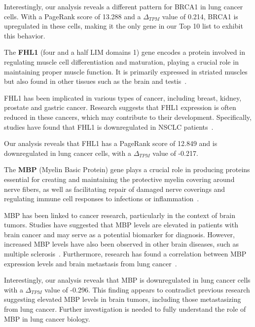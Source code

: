 Interestingly, our analysis reveals a different pattern for BRCA1 in lung cancer cells.
With a PageRank score of 13.288 and a $\Delta_{TPM}$ value of 0.214,
BRCA1 is upregulated in these cells, making it the only gene in our Top 10 list to exhibit this behavior.
\newline

The \textbf{FHL1} (four and a half LIM domains 1) gene encodes a protein
involved in regulating muscle cell differentiation and maturation,
playing a crucial role in maintaining proper muscle function.
It is primarily expressed in striated muscles but also found in other tissues such as the brain and testis~\cite{Storey2020FHL1}.

FHL1 has been implicated in various types of cancer, including breast, kidney, prostate and gastric cancer.
Research suggests that FHL1 expression is often reduced in these cancers,
which may contribute to their development\cite{Li2008FHL1, Sakashita2008FHL1}.
Specifically, studies have found that FHL1 is downregulated in NSCLC patients~\cite{Niu2012FHL1}.

Our analysis reveals that FHL1 has a PageRank score of 12.849 and is downregulated in lung cancer cells,
with a $\Delta_{TPM}$ value of -0.217.
\newline

The \textbf{MBP} (Myelin Basic Protein) gene plays a crucial role in producing proteins essential for creating and
maintaining the protective myelin covering around nerve fibers, as well as
facilitating repair of damaged nerve coverings and regulating immune cell responses to infections or inflammation~\cite{Nye1995MBP}.

MBP has been linked to cancer research, particularly in the context of brain tumors.
Studies have suggested that MBP levels are elevated in patients with brain cancer and may serve as a potential biomarker for diagnosis.
However, increased MBP levels have also been observed in other brain diseases, such as multiple sclerosis~\cite{Zavialova2017MBP}.
Furthermore, research has found a correlation between MBP expression levels and brain metastasis from lung cancer~\cite{Nakagawa1994MBP}.

Interestingly, our analysis reveals that MBP is downregulated in lung cancer cells with a $\Delta_{TPM}$ value of -0.296.
This finding appears to contradict previous research suggesting elevated MBP levels in brain tumors,
including those metastasizing from lung cancer.
Further investigation is needed to fully understand the role of MBP in lung cancer biology.
\newline

